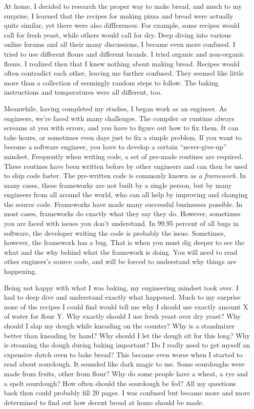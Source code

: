At home, I decided to research the proper way to make bread, and much to my surprise,
I learned that the recipes for making pizza and bread were actually quite similar, yet
there were also diffferences. For example, some recipes would call for fresh yeast, while
others would call for dry. Deep diving into various online forums and all their many
discussions, I became even more confused.
I tried to use different flours and different brands. I tried organic and non-organic flours.
I realized then that I knew nothing about making bread. Recipes would often contradict each other,
leaving me further confused. They seemed like little more than a collection of seemingly random
steps to follow. The baking instructions and temperatures were all different, too.

Meanwhile, having completed my studies, I began work as an engineer.
As engineers, we're faced with many challenges. The compiler or runtime
always screams at you with errors, and you have to figure out how to fix them.
It can take hours, or sometimes even days just to fix a simple problem. If you want
to become a software engineer, you have to develop a certain ``never-give-up'' mindset.
Frequently when writing code, a set of pre-made routines are required. These routines have been
written before by other engineers and can then be used to ship code faster.
The pre-written code is commonly known as {\it a framework}. In many cases,
these frameworks are not built by a single person, but by many engineers from all around the world,
who can all help by improving and changing the source code. Frameworks have made many successful
businesses possible. In most cases, frameworks do exactly what they say they do. However,
sometimes you are faced with issues you don't understand. In 99.95 percent
of all bugs in software, the developer writing the code is probably the issue.
Sometimes, however, the framework has a bug. That is when you must dig deeper to
see the what and the why behind what the framework is doing. You will need to read other
engineer's source code, and will be forced to understand why things are happening.

Being not happy with what I was baking, my engineering mindset took over. I had
to deep dive and understand exactly what happened. Much to my surprise none
of the recipes I could find would tell me why I should use exactly amount X
of water for flour Y. Why exactly should I use fresh yeast over dry yeast?
Why should I slap my dough while kneading on the counter? Why is a standmixer
better than kneading by hand?  Why should I let the dough sit for this long?
Why is steaming the dough during baking important? Do I really need to
get myself an expensive dutch oven to bake bread? This became even worse
when I started to read about sourdough. It sounded like dark magic to me.
Some sourdoughs were made from fruits, other from flour? Why do some
people have a wheat, a rye and a spelt sourdough? How often should the sourdough be
fed? All my questions back then could probably fill 20 pages. I was confused
but became more and more determined to find out how decent bread at home
should be made.

